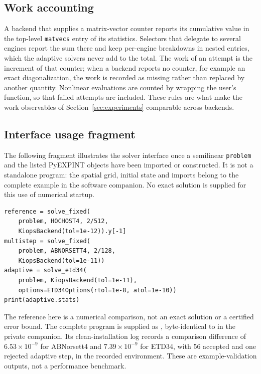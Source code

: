 \subsection{Work accounting}

A backend that supplies a matrix-vector counter reports its cumulative
value in the top-level \texttt{matvecs} entry of its statistics.  Selectors that delegate to
several engines report the sum there and keep per-engine breakdowns in nested
entries, which the adaptive solvers never add to the total.  The work of an
attempt is the increment of that counter; when a backend reports no counter,
for example an exact diagonalization, the work is recorded as missing rather
than replaced by another quantity.  Nonlinear evaluations are counted by
wrapping the user's function, so that failed attempts are included.  These
rules are what make the work observables of Section~\ref{sec:experiments}
comparable across backends.

\subsection{Interface usage fragment}\label{sec:example}

The following fragment illustrates the solver interface once a semilinear
\texttt{problem} and the listed PyEXPINT objects have been imported or
constructed.  It is not a standalone program: the spatial grid, initial state
and imports belong to the complete example in the software companion.  No
exact solution is supplied for this use of numerical startup.
\begin{verbatim}
reference = solve_fixed(
    problem, HOCHOST4, 2/512,
    KiopsBackend(tol=1e-12)).y[-1]
multistep = solve_fixed(
    problem, ABNORSETT4, 2/128,
    KiopsBackend(tol=1e-11))
adaptive = solve_etd34(
    problem, KiopsBackend(tol=1e-11),
    options=ETD34Options(rtol=1e-8, atol=1e-10))
print(adaptive.stats)
\end{verbatim}
The reference here is a numerical comparison, not an exact solution or a
certified error bound.  The complete program is supplied as
, byte-identical to
 in the private companion.
Its clean-installation log records a comparison difference of
$6.53\times10^{-9}$ for ABNorsett4 and $7.39\times10^{-9}$ for ETD34,
with 56 accepted and one rejected adaptive step, in the recorded environment.
These are example-validation outputs, not a performance benchmark.

